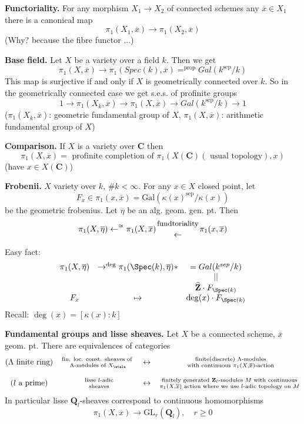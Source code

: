 \medskip\noindent
{\bf Functoriality.} For any morphism $X_1\to X_2$ of connected schemes
any $\overline x\in X_1$ there is a canonical map
$$
\pi_1(X_1, \overline x) \to \pi_1(X_2, \overline x)
$$
(Why? because the fibre functor ...)

\medskip\noindent
{\bf Base field.} Let $X$ be a variety over a field $k$. Then we get 	
$$
\pi_1(X, \overline x) \to
\pi_1(Spec(k), \overline x) =^{\text{prop}} Gal(k^{\text{sep}}/k)
$$
This map is surjective if and only if $X$ is geometrically connected over $k$.
So in the geometrically connected case we get s.e.s. of profinite
groups
$$
1 \to \pi_1(X_{\overline k}, \overline x) \to
\pi_1(X, \overline x) \to
Gal(k^{\text{sep}}/k) \to 1
$$
($\pi_1(X_{\overline k}, \overline x)$: geometric fundamental group of
$X$, $\pi_1(X, \overline x)$: arithmetic fundamental group of $X$)

\medskip\noindent
{\bf Comparison.} If $X$ is a variety over $\mathbf{C}$ then
$$
\pi_1(X, \overline x) =
\text{ profinite completion of }
\pi_1(X(\mathbf{C})(\text{ usual topology}), x)
$$
(have $x\in X(\mathbf{C})$)

\medskip\noindent
{\bf Frobenii.} $X$ variety over $k$, $\# k < \infty$. For any $x \in X$
closed point, let
$$
F_x\in \pi_1(x, \overline x) =
\text{Gal}(\kappa(x)^{\text{sep}}/\kappa(x))
$$
be the geometric frobenius.
Let $\overline\eta$ be an alg. geom. gen. pt. Then
$$
\pi_1(X, \overline\eta) \leftarrow^{\cong}
\pi_1(X, \overline x)
{\text{\small fundtoriality}\atop\leftarrow}
\pi_1(x, \overline x)
$$

\noindent
Easy fact:
$$
\begin{matrix}
\pi_1(X, \overline \eta) & \to^{\deg} \pi_1(\Spec(k), \overline \eta) * &
= Gal(k^{sep}/k) \\
& & || \\
& & \widehat{\mathbf{Z}}\cdot F_{\Spec(k)} \\
F_x & \mapsto & \deg(x)\cdot F_{\Spec(k)}
\end{matrix}
$$
Recall: $\deg(x) = [\kappa(x):k]$

\medskip\noindent
{\bf Fundamental groups and lisse sheaves.}
Let $X$ be a connected scheme, $\overline x$ geom. pt. There are
equivalences of categories
$$
\begin{matrix}
\text{($\Lambda$ finite ring)}& \text{fin. loc. const. sheaves
of }
\atop \Lambda\text{-modules of }X_\etale & \leftrightarrow &
\text{ finite(discrete) }\Lambda\text{-modules}\atop\text{ with continuous
}\pi_1(X, \overline x)\text{-action}\\
\\
(l\text{ a prime}) & \text{ lisse }l\text{-adic}\atop\text{
sheaves} & \leftrightarrow & \text{ finitely generated
}\mathbf{Z}_l\text{-modules } M \text{ with continuous }\atop \pi_1(X,
\overline x)\text{ action where we use $l$-adic topology on } M
\end{matrix}
$$
In particular lisse $\mathbf{Q}_l$-sheaves correspond to continuous
homomorphisms
$$
\pi_1(X, \overline x) \to \text{GL}_r(\mathbf{Q}_l), \quad r\geq 0
$$

